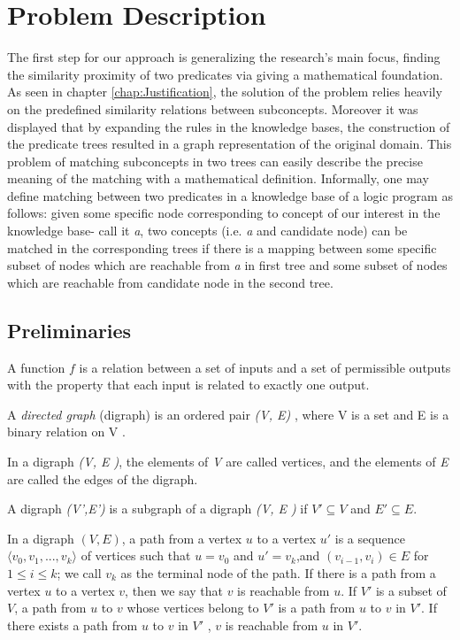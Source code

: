 \documentclass[egilmezThesis.tex]{subfiles}
\begin{document}

%

\section{Problem Description}
\label{PD}

The first step for our approach is generalizing the research's main focus, finding the similarity proximity of two predicates via giving a mathematical foundation. As seen in chapter \ref{chap:Justification}, the solution of the problem relies heavily on the predefined similarity relations between subconcepts. Moreover it was displayed that by expanding the rules in the knowledge bases, the construction of the predicate trees resulted in a graph representation of the original domain. This problem of matching subconcepts in two trees can easily describe the precise meaning of the matching with a mathematical definition. Informally, one may define matching between two predicates in a knowledge base of a logic program as follows: given some specific node corresponding to concept of our interest in the knowledge base- call it \textit{a}, two concepts (i.e. \textit{a} and candidate node) can be matched in the corresponding trees if there is a mapping between some specific subset of nodes which are reachable from \textit{a} in first tree and some subset of nodes which are reachable from candidate node in the second tree. 

\subsection{Preliminaries}
\label{prem}
A function $f$ is a relation between a set of inputs and a set of permissible outputs with the property that each input is related to exactly one output.

A \textit{directed graph}  (digraph) is an ordered pair \textit{ (V, E)} , where V is a set and E is a binary relation on V .

In a digraph \textit{(V, E )}, the elements of \textit{V} are called vertices, and the elements of \textit{E} are called the edges of the digraph.

A digraph \textit{(V',E')} is a subgraph of a digraph \textit{(V, E )} if ${V'} \subseteq {V}$ and ${E'} 
\subseteq {E}.$

In a digraph $(V,E)$, a path from a vertex $u$ to a vertex $u'$ is a sequence $\langle v_0,v_1,... ,v_k \rangle$ of vertices such that $u=v_0$ and $u' =v_k$,and $(v_{i-1},v_i)  \in E$ for $1 \leq i \leq k$; we call $v_k$ as the terminal node of the path. If there is a path from a vertex $u$ to a vertex $v$, then we say that $v$ is reachable from $u$. If $V'$ is a subset of $V$, a path from $u$ to $v$ whose vertices belong to $V'$ is a path from $u$ to $v$ in $V'$. If there exists a path from $u$ to $v$ in $V'$ , $v$ is reachable from $u$ in $V'$.
\end{document}
